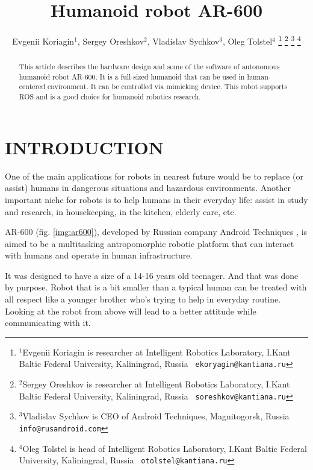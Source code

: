 \documentclass[letterpaper, 10 pt, conference]{ieeeconf}  %
\title{\LARGE \bf
Humanoid robot AR-600
}
\author{Evgenii Koriagin$^{1}$, Sergey Oreshkov$^{2}$, Vladislav
Sychkov$^{3}$, Oleg Tolstel$^{4}$%
\thanks{$^{1}$Evgenii Koriagin is researcher at Intelligent Robotics
Laboratory, I.Kant Baltic Federal University, Kaliningrad, Russia {\tt\small
ekoryagin@kantiana.ru}}%
\thanks{$^{2}$Sergey Oreshkov is researcher at Intelligent Robotics
Laboratory, I.Kant Baltic Federal University, Kaliningrad, Russia {\tt\small
soreshkov@kantiana.ru}}%
\thanks{$^{3}$Vladislav Sychkov is CEO of Android Techniques, Magnitogorsk,
Russia {\tt\small info@rusandroid.com}}%
\thanks{$^{4}$Oleg Tolstel is head of Intelligent Robotics
Laboratory, I.Kant Baltic Federal University, Kaliningrad, Russia {\tt\small
otolstel@kantiana.ru}}%
}
\begin{document}
\maketitle
\thispagestyle{empty}
\pagestyle{empty}


\begin{abstract}

This article describes the hardware design and some of the software of
autonomous humanoid robot AR-600. It is a full-sized humanoid that can be
used in human-centered environment. It can be controlled via
mimicking device. This robot supports ROS and is a good choice for
humanoid robotics research.

\end{abstract}


\section{INTRODUCTION}

One of the main applications for robots in nearest future would be to replace
(or assist) humans in dangerous situations and hazardous environments. Another
important niche for robots is to help humans in their everyday life: assist in
study and research, in housekeeping, in the kitchen, elderly care, etc.

AR-600 (fig. \ref{img:ar600}), developed by Russian company Android Techniques
\cite{c1}, is aimed to be a multitasking antropomorphic robotic platform that
can interact with humans and operate in human infrastructure. 
   
It was designed to have a size of a 14-16 years old teenager. And that was done
by purpose. Robot that is a bit smaller than a typical human can be treated
with all respect like a younger brother who's trying to help in everyday
routine. Looking at the robot from above will lead to a better attitude while
communicating with it. 
  
\end{document}
